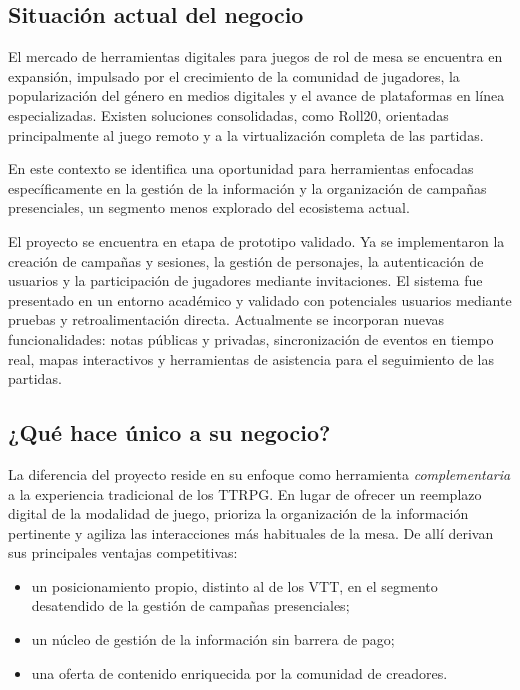 \subsection{Situación actual del negocio}
El mercado de herramientas digitales para juegos de rol de mesa se encuentra en expansión, impulsado por el crecimiento de la comunidad de jugadores, la popularización del género en medios digitales y el avance de plataformas en línea especializadas. Existen soluciones consolidadas, como Roll20, orientadas principalmente al juego remoto y a la virtualización completa de las partidas.

En este contexto se identifica una oportunidad para herramientas enfocadas específicamente en la gestión de la información y la organización de campañas presenciales, un segmento menos explorado del ecosistema actual.

El proyecto se encuentra en etapa de prototipo validado. Ya se implementaron la creación de campañas y sesiones, la gestión de personajes, la autenticación de usuarios y la participación de jugadores mediante invitaciones. El sistema fue presentado en un entorno académico y validado con potenciales usuarios mediante pruebas y retroalimentación directa. Actualmente se incorporan nuevas funcionalidades: notas públicas y privadas, sincronización de eventos en tiempo real, mapas interactivos y herramientas de asistencia para el seguimiento de las partidas.

\subsection{¿Qué hace único a su negocio?}
La diferencia del proyecto reside en su enfoque como herramienta \emph{complementaria} a la experiencia tradicional de los TTRPG. En lugar de ofrecer un reemplazo digital de la modalidad de juego, prioriza la organización de la información pertinente y agiliza las interacciones más habituales de la mesa. De allí derivan sus principales ventajas competitivas:
\begin{itemize}
  \item un posicionamiento propio, distinto al de los VTT, en el segmento desatendido de la gestión de campañas presenciales;
  \item un núcleo de gestión de la información sin barrera de pago;
  \item una oferta de contenido enriquecida por la comunidad de creadores.
\end{itemize}

